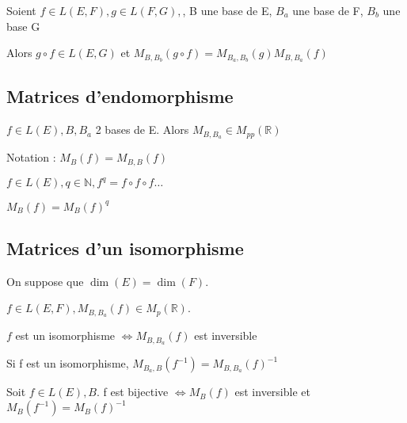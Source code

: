 \documentclass[french]{yLectureNote}
\newcommand{\N}[0]{\mathbb{N}}
\newcommand{\R}[0]{\mathbb{R}}
\begin{document}
\begin{proposition}
Soient \(f\in L(E,F), g\in L(F,G),\), B une base de E, \(B_a\) une base de F, \(B_b\) une base G

Alors \(g\circ f \in L(E,G)\) et \(M_{B,B_b}(g\circ f) = M_{B_a, B_b}(g) M_{B,B_a}(f)\)
\end{proposition}
\subsection{Matrices d'endomorphisme }
\(f\in L(E), B, B_a\) 2  bases de E. Alors \(M_{B,B_a}\in M_{pp}(\R)\)

Notation : \(M_B(f) = M_{B,B}(f)\)
%
%
\begin{proposition}
\(f\in L(E), q\in \N, f^q = f\circ f \circ f\dots\)

\(M_B(f) = M_{B}(f)^q\)
\end{proposition}
\subsection{Matrices d'un isomorphisme}
On suppose que \(\dim(E) = \dim(F)\).
\begin{proposition}
\(f\in L(E, F), M_{B,B_a}(f) \in M_{p}(\R)\).

\(f\) est un isomorphisme \(\iff  M_{B,B_a}(f)\) est inversible

Si f est un isomorphisme, \(M_{B_a, B}(f^{-1}) =  M_{B,B_a}(f)^{-1}\)

Soit \(f\in L(E), B\). f est bijective \(\iff M_B(f)\) est inversible et \(M_B(f^{-1}) = M_B(f)^{-1}\)
\end{proposition}
\end{document}
